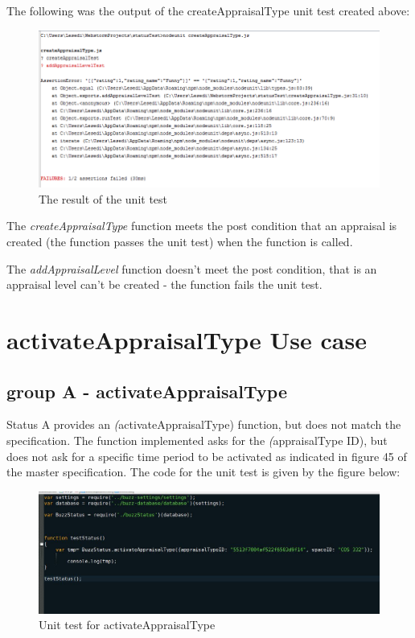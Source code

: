 \documentclass[a4paper,12pt]{article}
\begin{document}
The following was the output of the createAppraisalType unit test created above:
\begin{figure}[H]
		\centering
		\includegraphics[width=1.0\textwidth]{Figures/createAppraisalTypeUnitTestsResult.png}
		\caption{The result of the unit test}
	\end{figure}
	
The \textit{createAppraisalType} function meets the post condition that an appraisal is created (the function passes the unit test) when the function is called.

The \textit{addAppraisalLevel} function doesn't meet the post condition, that is an appraisal level can't be created - the function fails the unit test.

\newpage
\section{activateAppraisalType Use case}
\subsection{group A - activateAppraisalType}

Status A provides an \textit(activateAppraisalType) function, but does not match the specification. The function implemented asks for the \textit(appraisalType ID), but does not ask for a specific time period to be activated as indicated in figure 45 of the master specification. The code for the unit test is given by the figure below:


	\begin{figure}[H]
		\centering
		\includegraphics[width=1.0\textwidth]{Figures/activateTypeAtestcode.JPG}
		\caption{Unit test for activateAppraisalType}
	\end{figure}
\end{document}
